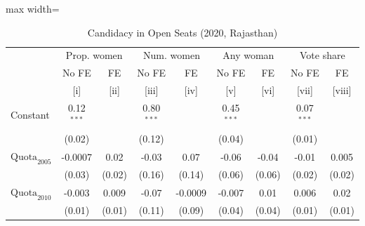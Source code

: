 
\begin{table}[htbp]
   \centering
   \scriptsize
   \begin{adjustbox}{max width=\linewidth}
      \begin{threeparttable}[b]
         \caption{\label{tab:candidacy_combined} Candidacy in Open Seats (2020, Rajasthan)}
         \bigskip
         \begin{tabular}{lcccccccc}
            \toprule
             & \multicolumn{2}{c}{Prop. women} & \multicolumn{2}{c}{Num. women} & \multicolumn{2}{c}{Any woman} & \multicolumn{2}{c}{Vote share} \\ 
                                                                                                     & No FE        & FE            & No FE        & FE            & No FE        & FE            & No FE        & FE \\   
                                                                                                     & [i]          & [ii]          & [iii]        & [iv]          & [v]          & [vi]          & [vii]        & [viii]\\  
            \midrule 
            Constant                                                                                 & 0.12$^{***}$ &               & 0.80$^{***}$ &               & 0.45$^{***}$ &               & 0.07$^{***}$ &   \\   
                                                                                                     & (0.02)       &               & (0.12)       &               & (0.04)       &               & (0.01)       &   \\   
            $\text{Quota}_{2005}$                                                                    & -0.0007      & 0.02          & -0.03        & 0.07          & -0.06        & -0.04         & -0.01        & 0.005\\   
                                                                                                     & (0.03)       & (0.02)        & (0.16)       & (0.14)        & (0.06)       & (0.06)        & (0.02)       & (0.02)\\   
            $\text{Quota}_{2010}$                                                                    & -0.003       & 0.009         & -0.07        & -0.0009       & -0.007       & 0.01          & 0.006        & 0.02\\   
                                                                                                     & (0.01)       & (0.01)        & (0.11)       & (0.09)        & (0.04)       & (0.04)        & (0.01)       & (0.01)\\   

\end{tabular}
\end{threeparttable}
\end{adjustbox}
\end{table}
